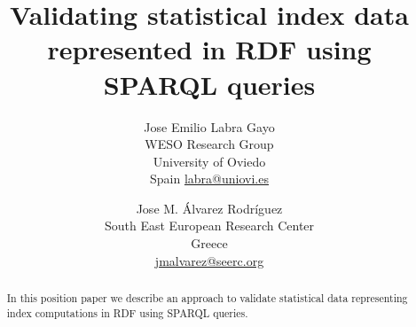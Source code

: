 \title{Validating statistical index data represented 
      in RDF using SPARQL queries} 
\author{Jose Emilio Labra Gayo \\
WESO Research Group \\
University of Oviedo\\
Spain 
\href{mailto:labra@uniovi.es}{labra@uniovi.es}
\and 
Jose M. \'{A}lvarez Rodr\'{i}guez \\
South East European Research Center\\
Greece \\
\href{mailto:jmalvarez@seerc.org}{jmalvarez@seerc.org}
}
\date{}

\maketitle

\begin{abstract}
In this position paper we describe an approach to validate statistical
data representing index computations in RDF using SPARQL queries.
\end{abstract}
